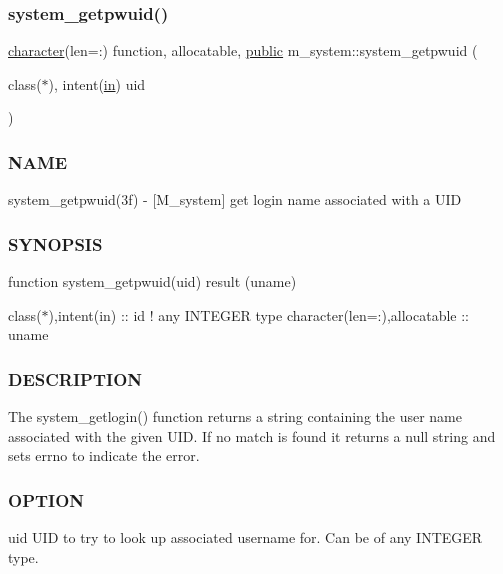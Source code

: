 \subsubsection{\texorpdfstring{system\+\_\+getpwuid()}{system\_getpwuid()}}
{\footnotesize\ttfamily \hyperlink{option__stopwatch_83_8txt_abd4b21fbbd175834027b5224bfe97e66}{character}(len=\+:) function, allocatable, \hyperlink{M__stopwatch_83_8txt_a2f74811300c361e53b430611a7d1769f}{public} m\+\_\+system\+::system\+\_\+getpwuid (\begin{DoxyParamCaption}\item[{class($\ast$), intent(\hyperlink{M__journal_83_8txt_afce72651d1eed785a2132bee863b2f38}{in})}]{uid }\end{DoxyParamCaption})}



\subsubsection*{N\+A\+ME}

system\+\_\+getpwuid(3f) -\/ \mbox{[}M\+\_\+system\mbox{]} get login name associated with a U\+ID \subsubsection*{S\+Y\+N\+O\+P\+S\+IS}

function system\+\_\+getpwuid(uid) result (uname)

class($\ast$),intent(in) \+:\+: id ! any I\+N\+T\+E\+G\+ER type character(len=\+:),allocatable \+:\+: uname

\subsubsection*{D\+E\+S\+C\+R\+I\+P\+T\+I\+ON}

\begin{DoxyVerb}The system_getlogin() function returns a string containing the user
name associated with the given UID. If no match is found
it returns a null string and sets errno to indicate the error.
\end{DoxyVerb}


\subsubsection*{O\+P\+T\+I\+ON}

uid U\+ID to try to look up associated username for. Can be of any I\+N\+T\+E\+G\+ER type.

